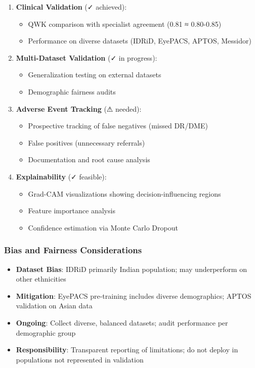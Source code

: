 \documentclass[12pt,a4paper]{article}
\begin{document}
\begin{enumerate}
    \item \textbf{Clinical Validation} (✓ achieved):
    \begin{itemize}
        \item QWK comparison with specialist agreement (0.81 ≈ 0.80-0.85)
        \item Performance on diverse datasets (IDRiD, EyePACS, APTOS, Messidor)
    \end{itemize}
    
    \item \textbf{Multi-Dataset Validation} (✓ in progress):
    \begin{itemize}
        \item Generalization testing on external datasets
        \item Demographic fairness audits
    \end{itemize}
    
    \item \textbf{Adverse Event Tracking} (⚠ needed):
    \begin{itemize}
        \item Prospective tracking of false negatives (missed DR/DME)
        \item False positives (unnecessary referrals)
        \item Documentation and root cause analysis
    \end{itemize}
    
    \item \textbf{Explainability} (✓ feasible):
    \begin{itemize}
        \item Grad-CAM visualizations showing decision-influencing regions
        \item Feature importance analysis
        \item Confidence estimation via Monte Carlo Dropout
    \end{itemize}
\end{enumerate}

\subsubsection{Bias and Fairness Considerations}

\begin{itemize}
    \item \textbf{Dataset Bias}: IDRiD primarily Indian population; may underperform on other ethnicities
    \item \textbf{Mitigation}: EyePACS pre-training includes diverse demographics; APTOS validation on Asian data
    \item \textbf{Ongoing}: Collect diverse, balanced datasets; audit performance per demographic group
    \item \textbf{Responsibility}: Transparent reporting of limitations; do not deploy in populations not represented in validation
\end{itemize}

\newpage

\end{document}
